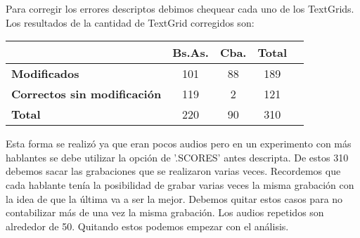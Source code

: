 Para corregir los errores descriptos debimos chequear cada uno de los TextGrids. Los resultados de la cantidad de TextGrid corregidos son:

\begin{table}[h]
\centering
\begin{tabular}{|l|c|c|c|c|}
\hline
\textbf{}  & \textbf{Bs.As. } & \textbf{Cba.} & \textbf{Total} \\ \hline
\textbf{Modificados}  & 101 & 88 & 189 \\ \hline
\textbf{Correctos sin modificación}  & 119 & 2 & 121 \\ \hline
\textbf{Total} & 220 & 90 & 310 \\ \hline
\end{tabular}
\end{table}

Esta forma se realizó ya que eran pocos audios pero en un experimento con más hablantes se debe utilizar la opción de '.SCORES' antes descripta. De estos 310 debemos sacar las grabaciones que se realizaron varias veces. Recordemos que cada hablante tenía la posibilidad de grabar varias veces la misma grabación con la idea de que la última va a ser la mejor. Debemos quitar estos casos para no contabilizar más de una vez la misma grabación. Los audios repetidos son alrededor de 50. Quitando estos podemos empezar con el análisis. 
